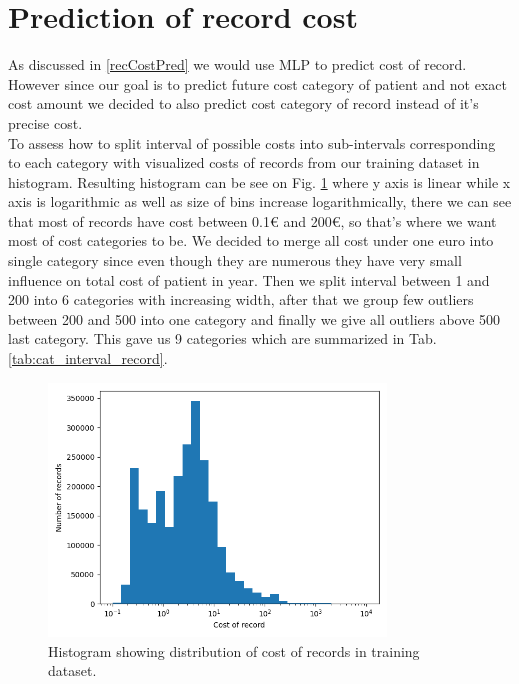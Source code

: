 
\section{Prediction of record cost}
\label{costPredImple}

As discussed in \ref{recCostPred} we would use MLP to predict cost of record. However since our goal is to predict future cost category of patient and not exact cost amount we decided to also predict cost category of record instead of it's precise cost.
\\

To assess how to split interval of possible costs into sub-intervals corresponding to each category with visualized costs of records from our training dataset in histogram. Resulting histogram can be see on Fig. \ref{fig:cost_hist} where y axis is linear while x axis is logarithmic as well as size of bins increase logarithmically, there we can see that most of records have cost between 0.1€ and 200€, so that's where we want most of cost categories to be. We decided to merge all cost under one euro into single category since even though they are numerous they have very small influence on total cost of patient in year. Then we split interval between 1 and 200 into 6 categories with increasing width, after that we group few outliers between 200 and 500 into one category and finally we give all outliers above 500 last category. This gave us 9 categories which are summarized in Tab. \ref{tab:cat_interval_record}.

\begin{figure}[!h]
	\centering
	
	\includegraphics[width=0.8\textwidth]{images/cost_hist.png} 
	
	\caption{Histogram showing distribution of cost of records in training dataset.}
	\label{fig:cost_hist}
\end{figure} 

